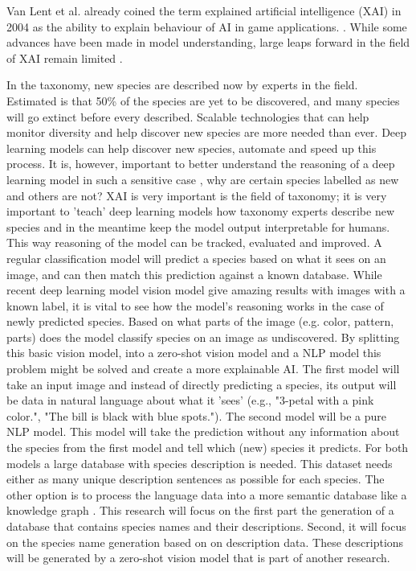 \documentclass{article}
\begin{document}
Van Lent et al. already coined the term explained artificial intelligence (XAI) in 2004 as the ability to explain behaviour of AI in game applications. \cite{van_lent_explainable_2004}.
While some advances have been made in model understanding, large leaps forward in the field of XAI remain limited \cite{lipton_mythos_2017, li_interpretable_2021}.

In the taxonomy, new species are described now by experts in the field.
Estimated is that 50\% of the species are yet to be discovered, and many species will go extinct before every described.
Scalable technologies that can help monitor diversity and help discover new species are more needed than ever.
Deep learning models can help discover new species, automate and speed up this process.
It is, however, important to better understand the reasoning of a deep learning model in such a sensitive case \cite{carvalho_machine_2019}, why are certain species labelled as new and others are not?
XAI is very important is the field of taxonomy; it is very important to 'teach' deep learning models how taxonomy experts describe new species and in the meantime keep the model output interpretable for humans.
This way reasoning of the model can be tracked, evaluated and improved.
A regular classification model will predict a species based on what it sees on an image, and can then match this prediction against a known database.
While recent deep learning model vision model give amazing results with images with a known label, it is vital to see how the model's reasoning works in the case of newly predicted species.
Based on what parts of the image (e.g. color, pattern, parts) does the model classify species on an image as undiscovered.
By splitting this basic vision model, into a zero-shot vision model and a NLP model this problem might be solved and create a more explainable AI.
The first model will take an input image and instead of directly predicting a species, its output will be data in natural language about what it 'sees' (e.g., "3-petal with a pink color.", "The bill is black with blue spots.").
The second model will be a pure NLP model.
This model will take the prediction without any information about the species from the first model and tell which (new) species it predicts.
For both models a large database with species description is needed. 
This dataset needs either as many unique description sentences as possible for each species.
The other option is to process the language data into a more semantic database like a knowledge graph \cite{ontotext_what_2021}.
This research will focus on the first part the generation of a database that contains species names and their descriptions.
Second, it will focus on the species name generation based on on description data. 
These descriptions will be generated by a zero-shot vision model that is part of another research.
\end{document}

